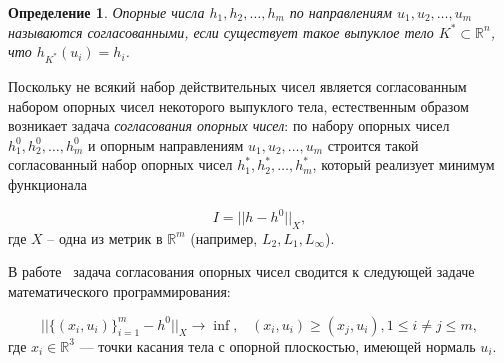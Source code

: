 \documentclass[a4paper, 11pt]{article}
\theoremstyle{MyDefinitionStyle}
\newtheorem{SmartDefinition}{Определение}
\theoremstyle{MyTheoremStyle}
\begin{document}
\begin{SmartDefinition}
 \label{def:consistency}
 Опорные числа $h_{1}, h_{2}, \ldots, h_{m}$ по направлениям
 $u_{1}, u_{2}, \ldots, u_{m}$ называются \emph{согласованными}, если
 существует такое выпуклое тело  $K^{*} \subset \mathbb{R}^{n}$, что
 $h_{K^{*}}(u_{i}) = h_{i}$.
\end{SmartDefinition}

Поскольку не всякий набор действительных чисел является
согласованным набором опорных чисел некоторого выпуклого тела, естественным
образом возникает задача \textit{согласования опорных чисел}: по набору опорных
чисел $h^{0}_{1}, h^{0}_{2}, \ldots, h^{0}_{m}$ и опорным направлениям
$u_{1}, u_{2}, \ldots, u_{m}$ строится такой согласованный набор опорных чисел
$h^{*}_{1}, h^{*}_{2}, \ldots, h^{*}_{m}$, который реализует минимум функционала

\begin{equation*}
 I = || h - h^{0} ||_{X},
\end{equation*}
где $X$ -- одна из метрик  в $\mathbb{R}^{m}$ (например,
$L_{2}, L_{1}, L_{\infty}$).

В работе~\cite{GardnerKiderlen} задача согласования опорных чисел сводится к
следующей задаче математического программирования:

\begin{equation*}
 ||\{(x_{i}, u_{i})\}_{i = 1}^{m} - h^{0}||_{X} \to \inf, \;\;\;
 (x_{i}, u_{i}) \geq (x_{j}, u_{i}), 1 \leq i \neq j \leq m,
\end{equation*}
где $x_{i} \in \mathbb{R}^{3}$ --- точки касания тела с опорной плоскостью,
имеющей нормаль $u_{i}$.
\end{document}
